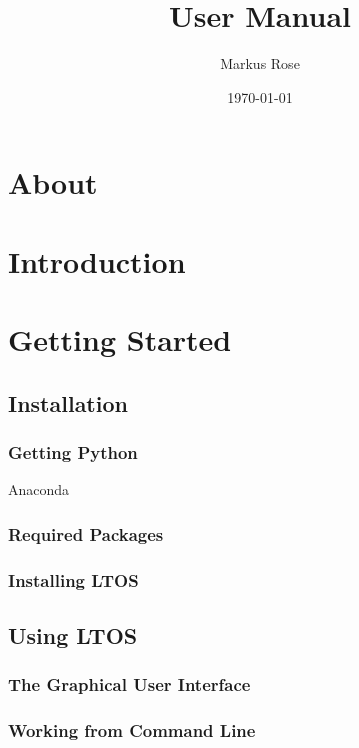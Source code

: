\documentclass[oneside,letterpaper]{scrbook}
\author{Markus Rose}
\title{\PN User Manual}
\date{\today}
\newcommand{\PN}{LTOS}
\begin{document}
\frontmatter
\maketitle

\tableofcontents

\listoffigures
\listoftables

\chapter{About}


\mainmatter
\chapter{Introduction}

\chapter{Getting Started}

\section{Installation}

\subsection{Getting Python}

Anaconda \href{}{}

\subsection{Required Packages}

\subsection{Installing \PN}

\section{Using \PN}\parindent 0pt


\subsection{The Graphical User Interface}

\subsection{Working from Command Line}
\end{document}
